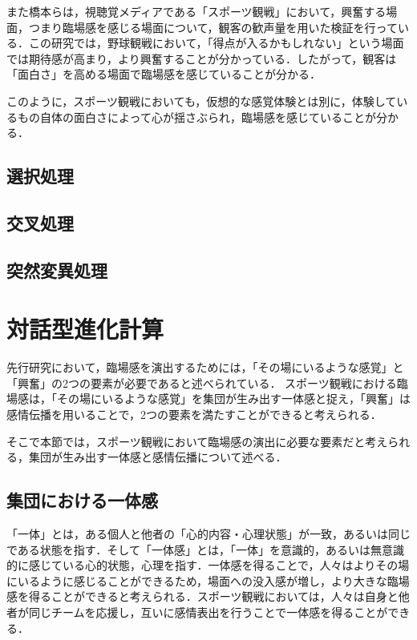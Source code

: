 また橋本らは，視聴覚メディアである「スポーツ観戦」において，興奮する場面，つまり臨場感を感じる場面について，観客の歓声量を用いた検証を行っている\cite{rinjyo3}．この研究では，野球観戦において，「得点が入るかもしれない」という場面では期待感が高まり，より興奮することが分かっている．したがって，観客は「面白さ」を高める場面で臨場感を感じていることが分かる．

このように，スポーツ観戦においても，仮想的な感覚体験とは別に，体験しているもの自体の面白さによって心が揺さぶられ，臨場感を感じていることが分かる．

\subsection{選択処理}
\label{sec2.1.3}

\subsection{交叉処理}
\label{sec2.1.4}

\subsection{突然変異処理}
\label{sec2.1.5}




\newpage

\section{対話型進化計算}
\label{sec2.2}

先行研究において，臨場感を演出するためには，「その場にいるような感覚」と「興奮」の2つの要素が必要であると述べられている．
スポーツ観戦における臨場感は，「その場にいるような感覚」を集団が生み出す一体感と捉え，「興奮」は感情伝播を用いることで，2つの要素を満たすことができると考えられる．

そこで本節では，スポーツ観戦において臨場感の演出に必要な要素だと考えられる，集団が生み出す一体感と感情伝播について述べる．

\subsection{集団における一体感}
\label{sec2.2.1}

「一体」とは，ある個人と他者の「心的内容・心理状態」が一致，あるいは同じである状態を指す．そして「一体感」とは，「一体」を意識的，あるいは無意識的に感じている心的状態，心理を指す\cite{ittai}．一体感を得ることで，人々はよりその場にいるように感じることができるため，場面への没入感が増し，より大きな臨場感を得ることができると考えられる．スポーツ観戦においては，人々は自身と他者が同じチームを応援し，互いに感情表出を行うことで一体感を得ることができる．
    
